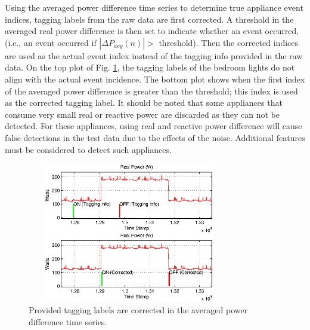 \documentclass[conference]{IEEEtran}
\begin{document}
Using the averaged power difference time series to determine true appliance event indices, tagging labels from the raw data are first corrected.  A threshold in the averaged real power difference is then set to indicate whether an event occurred, (i.e., an event occurred if $|\Delta P_{avg}(n)| >$ threshold).  Then the corrected indices are used as the actual event index instead of the tagging info provided in the raw data.  On the top plot of Fig. \ref{fig:tagging}, the tagging labels of the bedroom lights do not align with the actual event incidence.  The bottom plot shows when the first index of the averaged power difference is greater than the threshold; this index is used as the corrected tagging label.  It should be noted that some appliances that consume very small real or reactive power are discarded as they can not be detected.  For these appliances, using real and reactive power difference will cause false detections in the test data due to the effects of the noise.  Additional features must be considered to detect such appliances.

\begin{figure}[!t]
	\centering
	\includegraphics[height = 2.4in, width=3.5in]{fig/tagginginfo.eps}
	\caption{Provided tagging labels are corrected in the averaged power difference time series.}
	\label{fig:tagging}
\end{figure}
	
\end{document}
